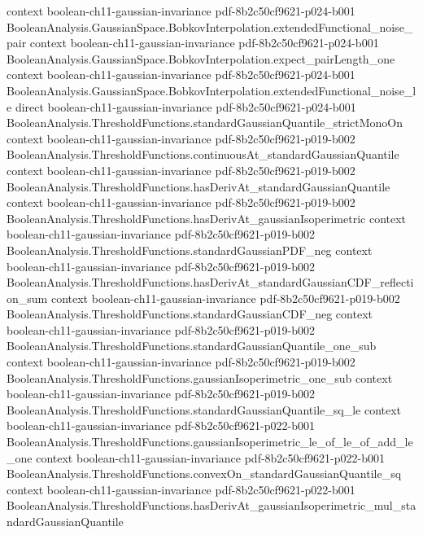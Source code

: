 \begin{theorem}
  {context}
  {boolean-ch11-gaussian-invariance}
  {pdf-8b2c50cf9621-p024-b001}
\proofstep
  {BooleanAnalysis.GaussianSpace.BobkovInterpolation.extendedFunctional_noise_pair}
  {context}
  {boolean-ch11-gaussian-invariance}
  {pdf-8b2c50cf9621-p024-b001}
\proofstep
  {BooleanAnalysis.GaussianSpace.BobkovInterpolation.expect_pairLength_one}
  {context}
  {boolean-ch11-gaussian-invariance}
  {pdf-8b2c50cf9621-p024-b001}
\proofstep
  {BooleanAnalysis.GaussianSpace.BobkovInterpolation.extendedFunctional_noise_le}
  {direct}
  {boolean-ch11-gaussian-invariance}
  {pdf-8b2c50cf9621-p024-b001}
\proofstep
  {BooleanAnalysis.ThresholdFunctions.standardGaussianQuantile_strictMonoOn}
  {context}
  {boolean-ch11-gaussian-invariance}
  {pdf-8b2c50cf9621-p019-b002}
\proofstep
  {BooleanAnalysis.ThresholdFunctions.continuousAt_standardGaussianQuantile}
  {context}
  {boolean-ch11-gaussian-invariance}
  {pdf-8b2c50cf9621-p019-b002}
\proofstep
  {BooleanAnalysis.ThresholdFunctions.hasDerivAt_standardGaussianQuantile}
  {context}
  {boolean-ch11-gaussian-invariance}
  {pdf-8b2c50cf9621-p019-b002}
\proofstep
  {BooleanAnalysis.ThresholdFunctions.hasDerivAt_gaussianIsoperimetric}
  {context}
  {boolean-ch11-gaussian-invariance}
  {pdf-8b2c50cf9621-p019-b002}
\proofstep
  {BooleanAnalysis.ThresholdFunctions.standardGaussianPDF_neg}
  {context}
  {boolean-ch11-gaussian-invariance}
  {pdf-8b2c50cf9621-p019-b002}
\proofstep
  {BooleanAnalysis.ThresholdFunctions.hasDerivAt_standardGaussianCDF_reflection_sum}
  {context}
  {boolean-ch11-gaussian-invariance}
  {pdf-8b2c50cf9621-p019-b002}
\proofstep
  {BooleanAnalysis.ThresholdFunctions.standardGaussianCDF_neg}
  {context}
  {boolean-ch11-gaussian-invariance}
  {pdf-8b2c50cf9621-p019-b002}
\proofstep
  {BooleanAnalysis.ThresholdFunctions.standardGaussianQuantile_one_sub}
  {context}
  {boolean-ch11-gaussian-invariance}
  {pdf-8b2c50cf9621-p019-b002}
\proofstep
  {BooleanAnalysis.ThresholdFunctions.gaussianIsoperimetric_one_sub}
  {context}
  {boolean-ch11-gaussian-invariance}
  {pdf-8b2c50cf9621-p019-b002}
\proofstep
  {BooleanAnalysis.ThresholdFunctions.standardGaussianQuantile_sq_le}
  {context}
  {boolean-ch11-gaussian-invariance}
  {pdf-8b2c50cf9621-p022-b001}
\proofstep
  {BooleanAnalysis.ThresholdFunctions.gaussianIsoperimetric_le_of_le_of_add_le_one}
  {context}
  {boolean-ch11-gaussian-invariance}
  {pdf-8b2c50cf9621-p022-b001}
\proofstep
  {BooleanAnalysis.ThresholdFunctions.convexOn_standardGaussianQuantile_sq}
  {context}
  {boolean-ch11-gaussian-invariance}
  {pdf-8b2c50cf9621-p022-b001}
\proofstep
  {BooleanAnalysis.ThresholdFunctions.hasDerivAt_gaussianIsoperimetric_mul_standardGaussianQuantile}

\end{theorem}
